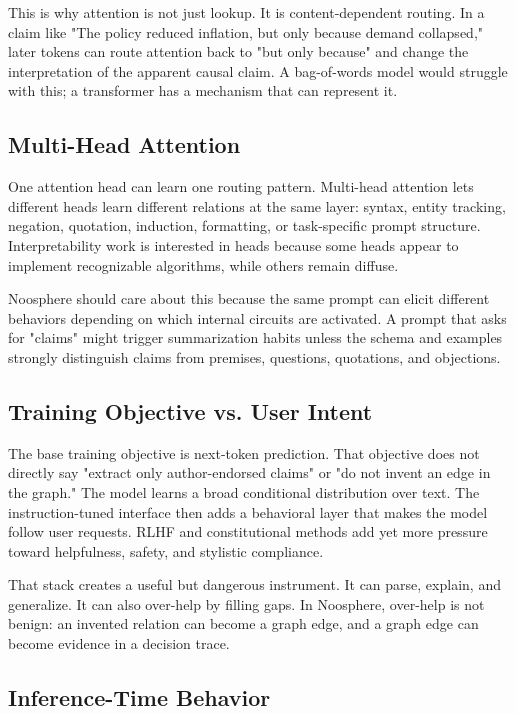 \documentclass[11pt]{article}
\begin{document}
This is why attention is not just lookup. It is content-dependent routing. In a
claim like "The policy reduced inflation, but only because demand collapsed,"
later tokens can route attention back to "but only because" and change the
interpretation of the apparent causal claim. A bag-of-words model would struggle
with this; a transformer has a mechanism that can represent it.

\subsection{Multi-Head Attention}

One attention head can learn one routing pattern. Multi-head attention lets
different heads learn different relations at the same layer: syntax, entity
tracking, negation, quotation, induction, formatting, or task-specific prompt
structure. Interpretability work is interested in heads because some heads
appear to implement recognizable algorithms, while others remain diffuse.

Noosphere should care about this because the same prompt can elicit different
behaviors depending on which internal circuits are activated. A prompt that
asks for "claims" might trigger summarization habits unless the schema and
examples strongly distinguish claims from premises, questions, quotations, and
objections.

\subsection{Training Objective vs. User Intent}

The base training objective is next-token prediction. That objective does not
directly say "extract only author-endorsed claims" or "do not invent an edge in
the graph." The model learns a broad conditional distribution over text. The
instruction-tuned interface then adds a behavioral layer that makes the model
follow user requests. RLHF and constitutional methods add yet more pressure
toward helpfulness, safety, and stylistic compliance.

That stack creates a useful but dangerous instrument. It can parse, explain, and
generalize. It can also over-help by filling gaps. In Noosphere, over-help is
not benign: an invented relation can become a graph edge, and a graph edge can
become evidence in a decision trace.

\subsection{Inference-Time Behavior}
\end{document}

